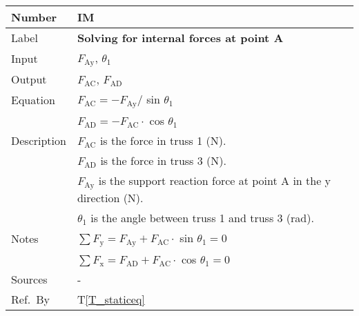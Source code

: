 \documentclass[12pt]{article}
\newcommand{\colAwidth}{0.13\textwidth}
\newcommand{\colBwidth}{0.82\textwidth}
\newcommand{\tref}[1]{T\ref{#1}}
\newcounter{instnum} %
\begin{document}
\noindent
\begin{minipage}{\textwidth}
	\renewcommand*{\arraystretch}{1.5}
	\begin{tabular}{| p{\colAwidth} | p{\colBwidth}|}
		\hline
		\rowcolor[gray]{0.9}
		Number& IM{instnum}\theinstnum \label{I_solveA}\\
		\hline
		Label& \bf Solving for internal forces at point A\\
		\hline
		Input& $F_{\text{Ay}}$, $\theta_1$\\
		\hline
		Output& $F_{\text{{AC}}}$, $F_{\text{{AD}}}$ \\
		\hline
		Equation& $F_{\text{{AC}}} = -F_{\text{Ay}} /$ sin $\theta_1$ \\
		&$F_{\text{{AD}}} = -F_{\text{{AC}}} \cdot$ cos $\theta_1$ \\
		\hline
		Description&$F_{\text{{AC}}}$ is the force in truss 1 (N).\\
		&$F_{\text{{AD}}}$ is the force in truss 3 (N).\\
		&$F_{\text{Ay}}$ is the support reaction force at point A in the y 
		direction (N).\\		
		&$\theta_1$ is the angle between truss 1 and truss 3 (\si{\radian}).\\
		\hline
		Notes& $\sum F_{\text{y}} = F_{\text{Ay}} + F_{\text{{AC}}} \cdot$ sin 
		$\theta_1 = 0$\\
		&$\sum F_{\text{x}} = F_{\text{AD}} + F_{\text{{AC}}} \cdot$ cos 
		$\theta_1 = 0$\\
		\hline
		Sources& - \\
		\hline
		Ref.\ By & \tref{T_staticeq} \\
		\hline
	\end{tabular}
\end{minipage}\\

~\newline
\end{document}

